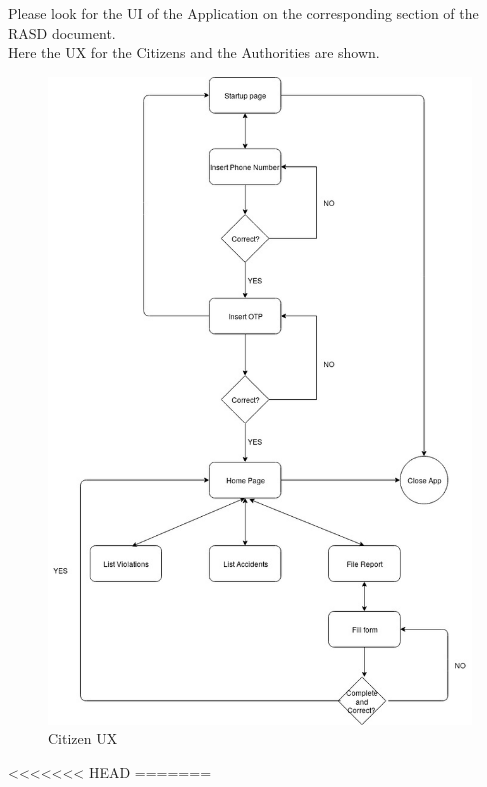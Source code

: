 \begin{flushleft}
Please look for the UI of the Application on the corresponding section of the RASD document.\\
Here the UX for the Citizens and the Authorities are shown.
\end{flushleft}
\begin{figure}[H]
	\centering
    \includegraphics[scale=0.5]{Images/citizen_ux.jpg}
    \caption{\label{fig:CitizenUX}Citizen UX}
    
\end{figure}
<<<<<<< HEAD
\newpage
\vspace{2cm}
=======

\newpage

